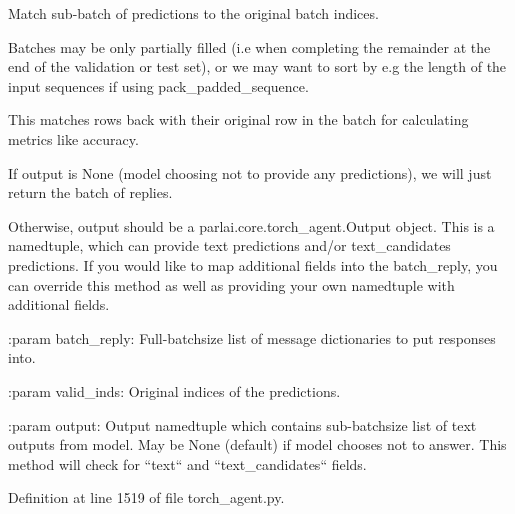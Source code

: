 \begin{DoxyVerb}Match sub-batch of predictions to the original batch indices.

Batches may be only partially filled (i.e when completing the remainder
at the end of the validation or test set), or we may want to sort by
e.g the length of the input sequences if using pack_padded_sequence.

This matches rows back with their original row in the batch for
calculating metrics like accuracy.

If output is None (model choosing not to provide any predictions), we
will just return the batch of replies.

Otherwise, output should be a parlai.core.torch_agent.Output object.
This is a namedtuple, which can provide text predictions and/or
text_candidates predictions. If you would like to map additional
fields into the batch_reply, you can override this method as well as
providing your own namedtuple with additional fields.

:param batch_reply:
    Full-batchsize list of message dictionaries to put responses into.

:param valid_inds:
    Original indices of the predictions.

:param output:
    Output namedtuple which contains sub-batchsize list of text outputs
    from model. May be None (default) if model chooses not to answer.
    This method will check for ``text`` and ``text_candidates`` fields.
\end{DoxyVerb}
 

Definition at line 1519 of file torch\+\_\+agent.\+py.


